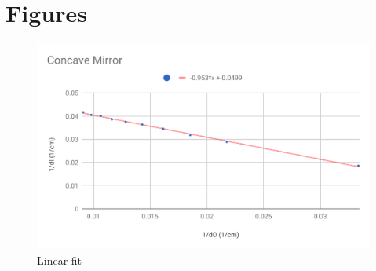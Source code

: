 \section{Figures}
%
\begin{figure}[ht]
    \centering
    \includegraphics[scale=0.74]{image/07-mirrors/chart.pdf}
    \caption{Linear fit}
    \label{figure.07.chart}
\end{figure}
%